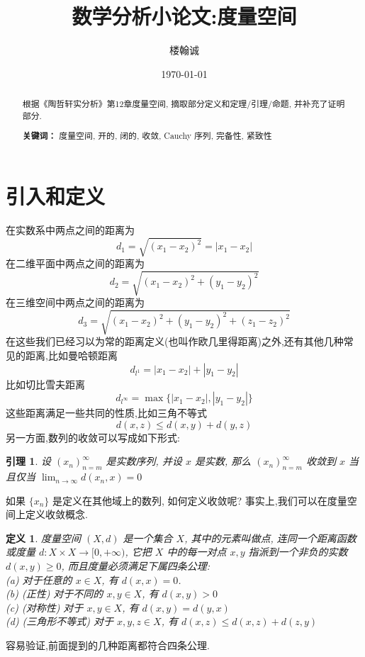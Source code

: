 \documentclass[12pt, a4paper, oneside]{ctexart}
\title{\textbf{数学分析小论文:度量空间}}
\author{楼翰诚}
\date{\today}
\newtheorem{definition}[theorem]{定义}
\newtheorem{lemma}[theorem]{引理}
\begin{document}
\maketitle

\setcounter{page}{0}
\maketitle
\thispagestyle{empty}

\begin{abstract}
    根据《陶哲轩实分析》第12章度量空间, 摘取部分定义和定理/引理/命题, 并补充了证明部分.
    \par\textbf{关键词：} 度量空间, 开的, 闭的, 收敛, Cauchy 序列, 完备性, 紧致性
\end{abstract}

\newpage
{}
\setcounter{page}{1}
\tableofcontents
\newpage
\setcounter{page}{1}

\section{引入和定义}

在实数系中两点之间的距离为
$$
    d_1=\sqrt{(x_1-x_2)^2}=|x_1-x_2|
$$
在二维平面中两点之间的距离为
$$
    d_2=\sqrt{(x_1-x_2)^2+(y_1-y_2)^2}
$$
在三维空间中两点之间的距离为
$$
    d_3=\sqrt{(x_1-x_2)^2+(y_1-y_2)^2+(z_1-z_2)^2}
$$
在这些我们已经习以为常的距离定义(也叫作欧几里得距离)之外,还有其他几种常见的距离,比如曼哈顿距离
$$
    d_{l^1}=|x_1-x_2|+|y_1-y_2|
$$
比如切比雪夫距离
$$
    d_{l^{\infty}}=\max\{|x_1-x_2|,|y_1-y_2|\}
$$
这些距离满足一些共同的性质,比如三角不等式
$$
    d(x,z)\leq d(x,y)+d(y,z)
$$
另一方面,数列的收敛可以写成如下形式:

\begin{lemma}
    设 $(x_n)^{\infty}_{n=m}$ 是实数序列, 并设 $x$ 是实数, 那么 $(x_n)^{\infty}_{n=m}$ 收敛到 $x$ 当且仅当 $\lim_{n\to\infty}d(x_n,x)=0$
\end{lemma}

如果 $\{x_n\}$ 是定义在其他域上的数列, 如何定义收敛呢? 事实上,我们可以在度量空间上定义收敛概念.
\begin{definition}
    度量空间 $(X,d)$ 是一个集合 $X$, 其中的元素叫做点, 连同一个距离函数或度量 $d:X\times X\to [0,+\infty)$,
    它把 $X$ 中的每一对点 $x,y$ 指派到一个非负的实数 $d(x,y)\geq 0$, 而且度量必须满足下属四条公理:\\
    (a) 对于任意的 $x\in X$, 有 $d(x,x)=0$.\\
    (b) (正性) 对于不同的 $x,y\in X$, 有 $d(x,y)>0$\\
    (c) (对称性) 对于 $x,y\in X$, 有 $d(x,y)=d(y,x)$\\
    (d) (三角形不等式) 对于 $x,y,z\in X$, 有 $d(x,z)\leq d(x,z) + d(z,y)$
\end{definition}
容易验证,前面提到的几种距离都符合四条公理.
\end{document}
